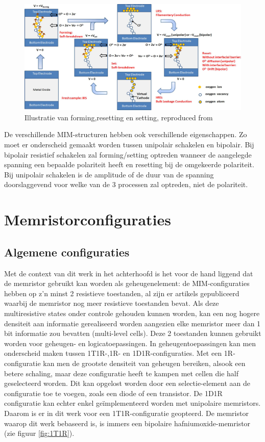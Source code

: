 \begin{figure}
  \centering
  \includegraphics[scale=0.22]{../fig/hfdstk-cel-forming-reset-set.png}
  \caption[Forming,resetting en setting van een memristor]{Illustratie van forming,resetting en setting, reproduced from\cite{Won12}}
  \label{fig:forming-reset-set}
\end{figure}

De verschillende MIM-structuren hebben ook verschillende eigenschappen. Zo moet er onderscheid gemaakt worden tussen unipolair schakelen en bipolair. Bij bipolair resistief schakelen zal forming/setting optreden wanneer de aangelegde spanning een bepaalde polariteit heeft en resetting bij de omgekeerde polariteit. Bij unipolair schakelen is de amplitude of de duur van de spanning doorslaggevend voor welke van de 3 processen zal optreden, niet de polariteit. 


\section{Memristorconfiguraties}

\subsection{Algemene configuraties}
Met de context van dit werk in het achterhoofd is het voor de hand liggend dat de memristor gebruikt kan worden als geheugenelement: de MIM-configuraties hebben op z'n minst 2 resistieve toestanden, al zijn er artikels gepubliceerd waarbij de memristor nog meer resistieve toestanden bevat\cite{Liu12}. Als deze multiresistive states onder controle gehouden kunnen worden, kan een nog hogere densiteit aan informatie gerealiseerd worden aangezien elke memristor meer dan 1 bit informatie zou bevatten (multi-level cells).
Deze 2 toestanden kunnen gebruikt worden voor geheugen- en logicatoepassingen\cite{ros12}\cite{raj09}. In geheugentoepassingen kan men onderscheid maken tussen 1T1R-,1R- en 1D1R-configuraties\cite{Den13}. Met een 1R-configuratie kan men de grootste densiteit van geheugen bereiken, alsook een betere schaling, maar deze configuratie heeft te kampen met cellen die half geselecteerd worden. Dit kan opgelost worden door een selectie-element aan de configuratie toe te voegen, zoals een diode of een transistor. De 1D1R configuratie kan echter enkel geïmplementeerd worden met unipolaire memristors\cite{Wou09}. Daarom is er in dit werk voor een 1T1R-configuratie geopteerd. De memristor waarop dit werk bebaseerd is, is immers een bipolaire hafniumoxide-memristor (zie figuur \ref{fig:1T1R}).

